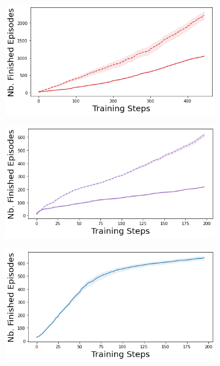 \begin{figure}
    \begin{subfigure}{.245\textwidth}
        \includegraphics[width=\textwidth]{sections/011_icml2022/resources/lunarlander-n_finished_training_episodes-dropout-training-strategy.png}
    \end{subfigure}
    \begin{subfigure}{.245\textwidth}
        \includegraphics[width=\textwidth]{sections/011_icml2022/resources/lunarlander-n_finished_training_episodes-ensemble-training-strategy.png}
    \end{subfigure}
    \begin{subfigure}{.245\textwidth}
        \includegraphics[width=\textwidth]{sections/011_icml2022/resources/lunarlander-n_finished_training_episodes-dkl-training-strategy.png}

\end{subfigure}
\end{figure}
